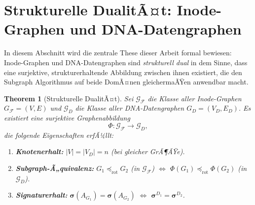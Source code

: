 ﻿\documentclass[a4paper,12pt]{article}
\theoremstyle{definition}
\theoremstyle{plain}
\newtheorem{theorem}{Theorem}[section]
\begin{document}
\section{Strukturelle DualitÃ¤t: Inode-Graphen und DNA-Datengraphen}
\label{sec:dualitaet}

In diesem Abschnitt wird die zentrale These dieser Arbeit formal bewiesen:
Inode-Graphen und DNA-Datengraphen sind \emph{strukturell dual} in dem Sinne,
dass eine surjektive, strukturerhaltende Abbildung zwischen ihnen existiert,
die den Subgraph Algorithmus auf beide DomÃ¤nen gleichermaÃŸen anwendbar macht.

\begin{theorem}[Strukturelle DualitÃ¤t]
\label{thm:dualitaet}
  Sei $\mathcal{G}_\mathcal{F}$ die Klasse aller Inode-Graphen
  $G_\mathcal{F} = (V, E)$ und $\mathcal{G}_D$ die Klasse aller
  DNA-Datengraphen $G_D = (V_D, E_D)$.
  Es existiert eine surjektive Graphenabbildung
  \[
    \Phi: \mathcal{G}_\mathcal{F} \longrightarrow \mathcal{G}_D,
  \]
  die folgende Eigenschaften erfÃ¼llt:
  \begin{enumerate}
    \item \textbf{Knotenerhalt:} $|V| = |V_D| = n$ (bei gleicher GrÃ¶ÃŸe).
    \item \textbf{Subgraph-Ã„quivalenz:}
          $G_1 \preceq_{\mathrm{rot}} G_2$ (in $\mathcal{G}_\mathcal{F}$)
          $\Longleftrightarrow$
          $\Phi(G_1) \preceq_{\mathrm{rot}} \Phi(G_2)$
          (in $\mathcal{G}_D$).
    \item \textbf{Signaturerhalt:}
          $\boldsymbol{\sigma}(A_{G_1}) = \boldsymbol{\sigma}(A_{G_2})$
          $\Longleftrightarrow$
          $\boldsymbol{\sigma}^{D_1} = \boldsymbol{\sigma}^{D_2}$.
  \end{enumerate}
\end{theorem}
\end{document}
